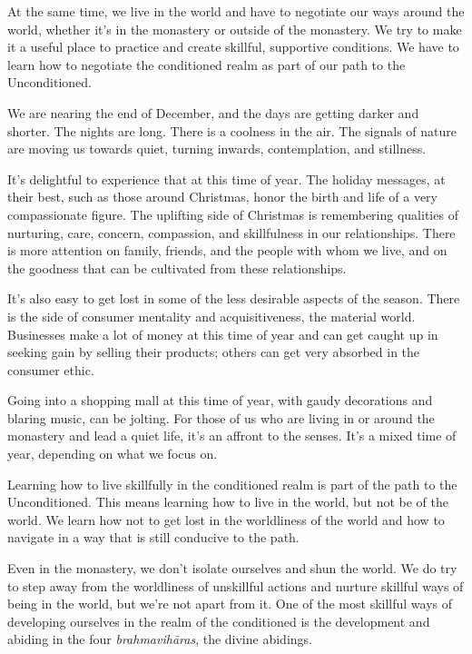 At the same time, we live in the world and have to negotiate our ways around the world, whether it's in the monastery or outside of the monastery. We try to make it a useful place to practice and create skillful, supportive conditions. We have to learn how to negotiate the conditioned realm as part of our path to the Unconditioned.

We are nearing the end of December, and the days are getting darker and shorter. The nights are long. There is a coolness in the air. The signals of nature are moving us towards quiet, turning inwards, contemplation, and stillness.

It's delightful to experience that at this time of year. The holiday messages, at their best, such as those around Christmas, honor the birth and life of a very compassionate figure. The uplifting side of Christmas is remembering qualities of nurturing, care, concern, compassion, and skillfulness in our relationships. There is more attention on family, friends, and the people with whom we live, and on the goodness that can be cultivated from these relationships.~

It's also easy to get lost in some of the less desirable aspects of the season. There is the side of consumer mentality and acquisitiveness, the material world. Businesses make a lot of money at this time of year and can get caught up in seeking gain by selling their products; others can get very absorbed in the consumer ethic.~

Going into a shopping mall at this time of year, with gaudy decorations and blaring music, can be jolting. For those of us who are living in or around the monastery and lead a quiet life, it's an affront to the senses. It's a mixed time of year, depending on what we focus on.~

Learning how to live skillfully in the conditioned realm is part of the path to the Unconditioned. This means learning how to live in the world, but not be of the world. We learn how not to get lost in the worldliness of the world and how to navigate in a way that is still conducive to the path.

Even in the monastery, we don't isolate ourselves and shun the world. We do try to step away from the worldliness of unskillful actions and nurture skillful ways of being in the world, but we're not apart from it. One of the most skillful ways of developing ourselves in the realm of the conditioned is the development and abiding in the four \emph{brahmavihāras}, the divine abidings.

